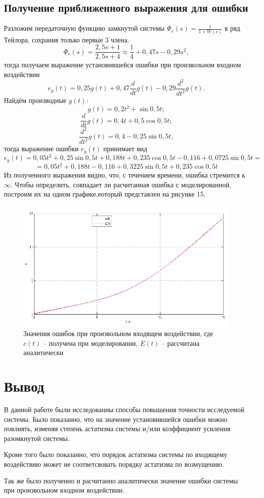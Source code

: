 \documentclass[a4paper, 11pt, russian]{article}
\begin{document}
    \subsection{Получение приближенного выражения для ошибки}
    Разложим передаточную функцию замкнутой системы $\Phi_e(s) = \displaystyle{\frac{1}{1 + W(s)}}$ в ряд Тейлора, сохранив только первые 3 члена. 
    $$\Phi_e(s) = \frac{2,5s + 1}{2,5s + 4} \approx \frac{1}{4} + 0,47s - 0,29s^2,$$
    тогда получаем выражение установившейся ошибки при произвольном входном воздействии
    $$e_y(t) = 0,25g(t) + 0,47\frac{d}{dt}g(t) - 0,29\frac{d^2}{dt^2}g(t).$$
    Найдём производные $g(t)$:
    $$g(t) = 0,2t^2 + \sin{0,5t};$$
    $$\frac{d}{dt}g(t) = 0,4t + 0,5\cos{0,5t};$$
    $$\frac{d^2}{dt^2}g(t) = 0,4 - 0,25\sin{0,5t},$$
    тогда выражение ошибки $e_y(t)$ принимает вид
    $$e_y(t) = 0,05t^2 + 0,25\sin{0,5t} + 0,188t + 0,235\cos{0,5t} - 0,116 + 0,0725\sin{0,5t} =$$
    $$= 0,05t^2 + 0,188t - 0,116 + 0,3225\sin{0,5t} + 0,235\cos{0,5t}$$
    Из полученного выражения видно, что, с течением времени, ошибка стремится к $\infty$. Чтобы определить, совпадает ли расчитанная ошибка с моделированной, построим их на одном графике,еоторый представлен на рисунке 15.
    \begin{figure}[ht!]
        \centering
        \includegraphics[scale = 0.75]{customInputTaylor.png}
        \caption{Значения ошибок при произвольном входящем воздействии, где $e(t)$ -- получена при моделировании, $E(t)$  -- рассчитана аналитически}
    \end{figure}
    \vspace{1.5cm}
    \section{Вывод}
    В данной работе были исследованны способы повышения точности исследуемой системы. Было показанно, что на значение установившейся ошибки можно повлиять, изменяя степень астатизма системы и/или коэффициент усиления разомкнутой системы.
    
    Кроме того было показанно, что порядок астатизма системы по входящему воздействию может не соответсвовать порядку астатизма по возмущению.
    
    Так же было полученно и расчитанно аналитически значение ошибки системы при произвольном входном воздействии.
\end{document}
